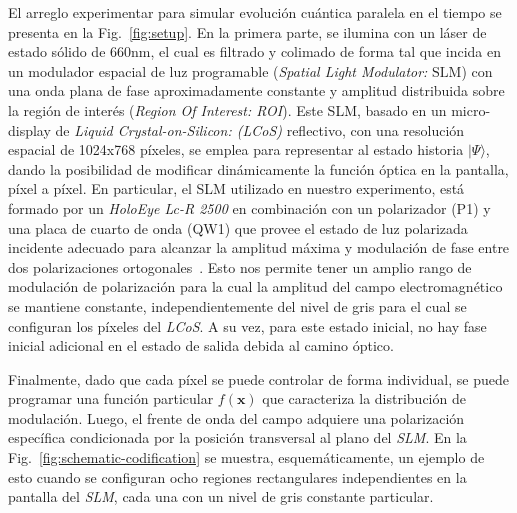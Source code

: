 El arreglo experimentar para simular evolución
cuántica paralela en el tiempo se presenta en la  Fig.~\ref{fig:setup}. En la primera parte, 
se ilumina con un láser de estado sólido de $660\text{nm}$,
el cual es filtrado y colimado de forma tal que incida en un 
modulador espacial de luz programable ({\it Spatial Light Modulator:} $\text{SLM}$) con una onda plana de fase aproximadamente constante y amplitud distribuida sobre la región de interés ({\it Region Of Interest: ROI}). 
Este SLM, basado en un micro-display de {\it Liquid Crystal-on-Silicon: (LCoS)} reflectivo, con una resolución 
espacial de 1024x768 píxeles, se emplea para representar al estado historia $|\Psi\rangle$, dando la posibilidad de modificar dinámicamente la función óptica en la pantalla, píxel a píxel.
En particular, el SLM utilizado en nuestro experimento,
está formado por un {\it HoloEye Lc-R 2500} 
en combinación con un polarizador (P1) 
y una placa de cuarto de onda (QW1) 
que provee el estado de luz
polarizada incidente adecuado 
para alcanzar la amplitud máxima
y modulación de fase entre dos polarizaciones ortogonales~\cite{marquez2001,marquez2008}.  %
Esto nos permite tener un amplio rango de modulación de polarización para la cual la amplitud del campo electromagnético se mantiene constante,
independientemente del nivel de gris para el cual se configuran los píxeles del {\it LCoS}. A su vez, para este estado inicial,
no hay fase inicial adicional en el estado de salida debida al 
camino óptico. %



Finalmente, dado que cada píxel se puede controlar de forma individual, se puede programar una función particular $f(\mathbf{x})$ 
que caracteriza la distribución de modulación. Luego, 
el frente de onda del campo adquiere una polarización específica condicionada por la posición transversal al plano del {\it SLM}. En la  Fig.~\ref{fig:schematic-codification} 
se muestra, esquemáticamente, un ejemplo de esto cuando se configuran ocho regiones rectangulares independientes en la pantalla del {\it  SLM}, cada una con un nivel de gris constante particular. 


